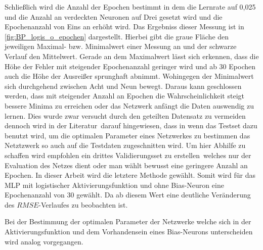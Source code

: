 Schließlich wird die Anzahl der Epochen bestimmt in dem die Lernrate auf 0,025 und die Anzahl an verdeckten Neuronen auf Drei gesetzt wird und die Epochenanzahl von Eins an erhöht wird. Das Ergebniss dieser Messung ist in \autoref{fig:BP_logis_o_epochen} dargestellt. Hierbei gibt die graue Fläche den jeweiligen Maximal- bzw. Minimalwert einer Messung an und der schwarze Verlauf den Mittelwert. Gerade an dem Maximalwert lässt sich erkennen, dass die Höhe der Fehler mit steigender Epochenanzahl geringer wird und ab 30 Epochen auch die Höhe der Ausreißer sprunghaft abnimmt. Wohingegen der Minimalwert sich durchgehend zwischen Acht und Neun bewegt. Daraus kann geschlossen werden, dass mit steigender Anzahl an Epochen die Wahrscheinlichkeit steigt bessere Minima zu erreichen oder das Netzwerk anfängt die Daten auswendig zu lernen. Dies wurde zwar versucht durch den geteilten Datensatz zu vermeiden dennoch wird in der Literatur\, darauf hingewiesen, dass in wenn das Testset dazu benutzt wird, um die optimalen Parameter eines Netzwerkes zu bestimmen das Netztzwerk so auch auf die Testdaten zugeschnitten wird. Um hier Abhilfe zu schaffen wird empfohlen ein drittes Validierungsset zu erstellen\, welches nur der Evaluation des Netzes dient oder man wählt bewusst eine geringere Anzahl an Epochen. In dieser Arbeit wird die letztere Methode gewählt. Somit wird für das MLP mit logistischer Aktivierungsfunktion und ohne Bias-Neuron eine Epochenanzahl von 30 gewählt. Da ab diesem Wert eine deutliche Veränderung des $RMSE$-Verlaufes zu beobachten ist.

Bei der Bestimmung der optimalen Parameter der Netzwerke welche sich in der Aktivierungsfunktion und dem Vorhandensein eines Bias-Neurons unterscheiden wird analog vorgegangen. 


